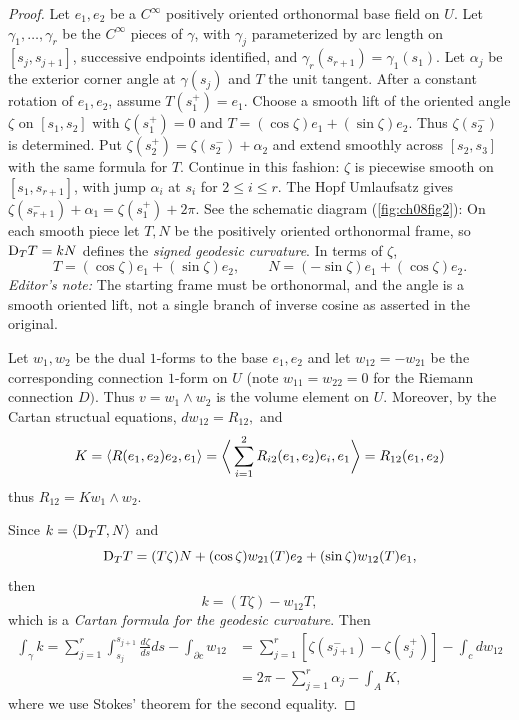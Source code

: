 \documentclass[../main]{subfiles}
\begin{document}
\begin{proof}
Let $e_1,e_2$ be a $C^\infty$ positively oriented orthonormal base field on $U$. Let $\gamma_1,\ldots,\gamma_r$ be the $C^\infty$ pieces of $\gamma$, with $\gamma_j$ parameterized by arc length on $[s_j,s_{j+1}]$, successive endpoints identified, and $\gamma_r(s_{r+1})=\gamma_1(s_1)$. Let $\alpha_j$ be the exterior corner angle at $\gamma(s_j)$ and $T$ the unit tangent. After a constant rotation of $e_1,e_2$, assume $T(s_1^+)=e_1$. Choose a smooth lift of the oriented angle $\zeta$ on $[s_1,s_2]$ with $\zeta(s_1^+)=0$ and $T=(\cos\zeta)e_1+(\sin\zeta)e_2$. Thus $\zeta(s_2^-)$ is determined. Put $\zeta(s_2^+)=\zeta(s_2^-)+\alpha_2$ and extend smoothly across $[s_2,s_3]$ with the same formula for $T$. Continue in this fashion: $\zeta$ is piecewise smooth on $[s_1,s_{r+1}]$, with jump $\alpha_i$ at $s_i$ for $2\leq i\leq r$. The Hopf Umlaufsatz gives $\zeta(s_{r+1}^-)+\alpha_1=\zeta(s_1^+)+2\pi$. See the schematic diagram (\ref{fig:ch08fig2}):  On each smooth piece let $T,N$ be the positively oriented orthonormal frame, so $\mathrm{D}_TT=kN$ defines the \emph{signed geodesic curvature}. In terms of $\zeta$,
\[T=(\cos\zeta)e_1+(\sin\zeta)e_2,\qquad N=(-\sin\zeta)e_1+(\cos\zeta)e_2.\]
\emph{Editor's note:} The starting frame must be orthonormal, and the angle is a smooth oriented lift, not a single branch of inverse cosine as asserted in the original.

Let $w_1,w_2$ be the dual $1$-forms to the base $e_1,e_2$ and let $w_{12}=-w_{21}$ be the corresponding connection $1$-form on $U$ (note $w_{11}=w_{22}=0$ for the Riemann connection $D).$ Thus $v=w_1 \wedge w_2$ is the volume element on $U.$ Moreover, by the Cartan structual equations, $dw_{12}=R_{12},$ and \[K=\left\langle R(e_1,e_2)e_2, e_1\right\rangle  = \bigg\langle \sum_{i=1}^2 R_{i2}(e_1, e_2)e_i,e_1\bigg\rangle = R_{12}(e_1,e_2)\] thus $R_{12}=Kw_{1} \wedge w_2.$ 

Since $k=\left\langle\mathrm{D}_TT,N\right\rangle$ and \[\mathrm{D}_TT=(T\zeta)N+(\cos \zeta)w_{21}(T)e_2+(\sin \zeta)w_{12}(T)e_1,\] then
\begin{equation}\tag{2}\label{eqn:ch08.2}
    k=(T\zeta)-w_{12}T,
\end{equation}
which is a \emph{Cartan formula for the geodesic curvature}. Then
\begin{align*}
    \int_{\gamma}k = \sum_{j=1}^r \int_{s_j}^{s_{j+1}} \frac{d\zeta}{ds}ds - \int_{\partial c}w_{12} &= \sum_{j=1}^r [\zeta(s_{j+1}^-)-\zeta(s_j^+)]-\int_{c}dw_{12}\\
    &= 2\pi-\sum_{j=1}^r \alpha_j - \int_{A} K,
\end{align*}
where we use Stokes' theorem for the second equality.
\end{proof}
\end{document}
